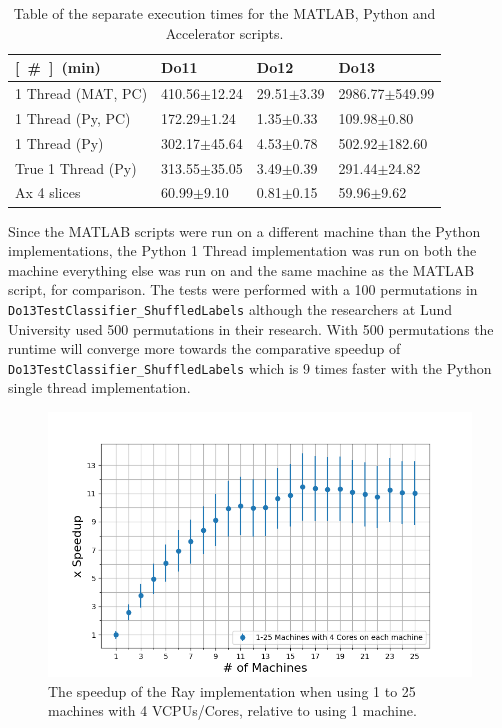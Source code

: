 \documentclass[12pt, a4paper]{article}
\begin{document}
\begin{table}[H]
\centering
    \begin{tabular}{|l|l|l|l|}
    \hline
    \unit[\#]{(min)}    & Do11             & Do12           & Do13               \\ \hline
    1 Thread (MAT, PC) & 410.56$\pm$12.24 & 29.51$\pm$3.39 & 2986.77$\pm$549.99 \\ \hline
    1 Thread (Py, PC)  & 172.29$\pm$1.24  & 1.35$\pm$0.33  & 109.98$\pm$0.80    \\ \hline
    1 Thread (Py)      & 302.17$\pm$45.64 & 4.53$\pm$0.78  & 502.92$\pm$182.60  \\ \hline
    True 1 Thread (Py) & 313.55$\pm$35.05 & 3.49$\pm$0.39  & 291.44$\pm$24.82   \\ \hline
    Ax 4 slices        & 60.99$\pm$9.10   & 0.81$\pm$0.15  & 59.96$\pm$9.62     \\ \hline
    \end{tabular}
    
    \caption{Table of the separate execution times for the MATLAB, Python and Accelerator scripts.}
    \label{AppendixSeperateTimes}
\end{table}


Since the MATLAB scripts were run on a different machine than the Python implementations, the Python 1 Thread implementation was run on both the machine everything else was run on and the same machine as the MATLAB script, for comparison.
The tests were performed with a 100 permutations in \texttt{Do13TestClassifier\_ShuffledLabels} although the researchers at Lund University used 500 permutations in their research.
With 500 permutations the runtime will converge more towards the comparative speedup of \texttt{Do13TestClassifier\_ShuffledLabels} which is 9 times faster with the Python single thread implementation.



\begin{figure}[H]
    \centering
    \includegraphics[width=1.0\textwidth, ]{pictures/MachinesXSpeedupWhite.png}
    \caption{The speedup of the Ray implementation when using 1 to 25 machines with 4 VCPUs/Cores, relative to using 1 machine.}
    \label{fig:MachineXSpeedup}
\end{figure}
\end{document}
